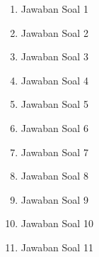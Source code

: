 \begin{enumerate}
\item Jawaban Soal 1


\item Jawaban Soal 2


\item Jawaban Soal 3


\item Jawaban Soal 4


\item Jawaban Soal 5


\item Jawaban Soal 6


\item Jawaban Soal 7


\item Jawaban Soal 8


\item Jawaban Soal 9


\item Jawaban Soal 10


\item Jawaban Soal 11


\end{enumerate}
\hfill \break

